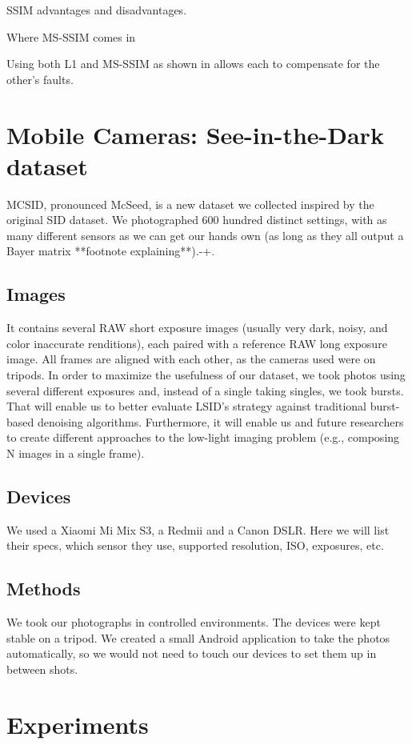SSIM advantages and disadvantages.

Where MS-SSIM comes in

Using both L1 and MS-SSIM as shown in \cite{DBLP:conf/miccai/RonnebergerFB15} allows each to compensate for the other's faults.


\chapter{Mobile Cameras: See-in-the-Dark dataset}
MCSID, pronounced McSeed, is a new dataset we collected inspired by the original SID dataset.
We photographed 600 hundred distinct settings, with as many different sensors as we can get our hands own (as long as they all output a Bayer matrix **footnote explaining**).-+.

\section{Images}
It contains several RAW short exposure images (usually very dark, noisy, and color inaccurate renditions), each paired with a reference RAW long exposure image.
All frames are aligned with each other, as the cameras used were on tripods.
In order to maximize the usefulness of our dataset, we took photos using several different exposures and, instead of a single taking singles, we took bursts.
That will enable us to better evaluate LSID's strategy against traditional burst-based denoising algorithms.
Furthermore, it will enable us and future researchers to create different approaches to the low-light imaging problem (e.g., composing N images in a single frame).

\section{Devices}
We used a Xiaomi Mi Mix S3, a Redmii and a Canon DSLR.
Here we will list their specs, which sensor they use, supported resolution, ISO, exposures, etc.

\section{Methods}
We took our photographs in controlled environments.
The devices were kept stable on a tripod.
We created a small Android application to take the photos automatically, so we would not need to touch our devices to set them up in between shots.


\chapter{Experiments}

\section{}
